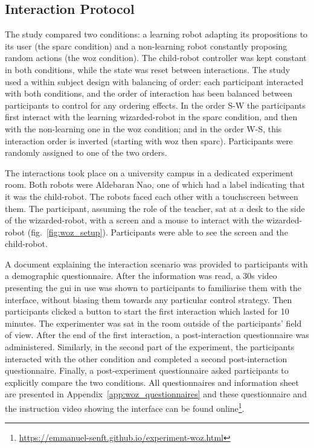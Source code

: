 \subsection{Interaction Protocol}

The study compared two conditions: a learning robot adapting its propositions to its user (the \gls{sparc} condition) and a non-learning robot constantly proposing random actions (the \gls{woz} condition). The child-robot controller was kept constant in both conditions, while the state was reset between interactions. The study used a within subject design with balancing of order: each participant interacted with both conditions, and the order of interaction has been balanced between participants to control for any ordering effects. In the order S-W the participants first interact with the learning wizarded-robot in the \gls{sparc} condition, and then with the non-learning one in the \gls{woz} condition; and in the order W-S, this interaction order is inverted (starting with \gls{woz} then \gls{sparc}). Participants were randomly assigned to one of the two orders.

The interactions took place on a university campus in a dedicated experiment room. Both robots were Aldebaran Nao, one of which had a label indicating that it was the child-robot. The robots faced each other with a touchscreen between them. The participant, assuming the role of the teacher, sat at a desk to the side of the wizarded-robot, with a screen and a mouse to interact with the wizarded-robot (fig.~\ref{fig:woz_setup}). Participants were able to see the screen and the child-robot.

A document explaining the interaction scenario was provided to participants with a demographic questionnaire. After the information was read, a 30s video presenting the \gls{gui} in use was shown to participants to familiarise them with the interface, without biasing them towards any particular control strategy. Then participants clicked a button to start the first interaction which lasted for 10 minutes. The experimenter was sat in the room outside of the participants' field of view. After the end of the first interaction, a post-interaction questionnaire was administered. Similarly, in the second part of the experiment, the participants interacted with the other condition and completed a second post-interaction questionnaire. Finally, a post-experiment questionnaire asked participants to explicitly compare the two conditions. All questionnaires and information sheet are presented in Appendix~\ref{app:woz_questionnaires} and these questionnaire and the instruction video showing the interface can be found online\footnote{ \url{https://emmanuel-senft.github.io/experiment-woz.html}}.

